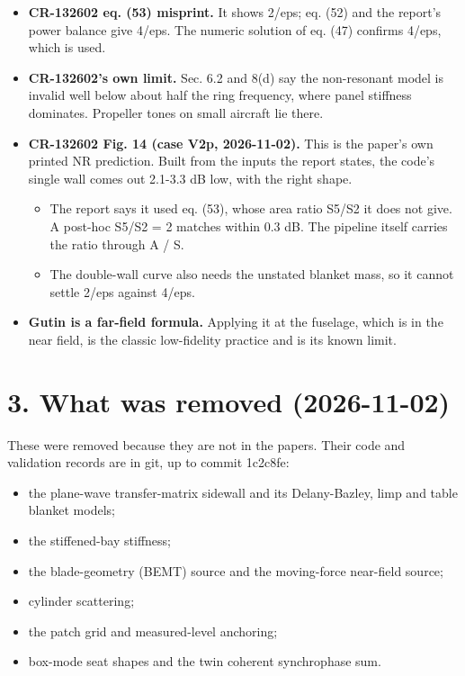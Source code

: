 \documentclass[10pt,a4paper]{article}
\begin{document}
\begin{itemize}
\item \textbf{CR-132602 eq. (53) misprint.} It shows 2/eps; eq. (52) and the report's power balance give 4/eps. The numeric solution of eq. (47) confirms 4/eps, which is used.
\item \textbf{CR-132602's own limit.} Sec. 6.2 and 8(d) say the non-resonant model is invalid well below about half the ring frequency, where panel stiffness dominates. Propeller tones on small aircraft lie there.
\item \textbf{CR-132602 Fig. 14 (case V2p, 2026-11-02).} This is the paper's own printed NR prediction. Built from the inputs the report states, the code's single wall comes out 2.1-3.3 dB low, with the right shape.
\begin{itemize}
\item The report says it used eq. (53), whose area ratio S5/S2 it does not give. A post-hoc S5/S2 = 2 matches within 0.3 dB. The pipeline itself carries the ratio through A / S.
\item The double-wall curve also needs the unstated blanket mass, so it cannot settle 2/eps against 4/eps.
\end{itemize}
\item \textbf{Gutin is a far-field formula.} Applying it at the fuselage, which is in the near field, is the classic low-fidelity practice and is its known limit.
\end{itemize}

\section*{3. What was removed (2026-11-02)}

These were removed because they are not in the papers. Their code and validation records are in git, up to commit 1c2c8fe:

\begin{itemize}
\item the plane-wave transfer-matrix sidewall and its Delany-Bazley, limp and table blanket models;
\item the stiffened-bay stiffness;
\item the blade-geometry (BEMT) source and the moving-force near-field source;
\item cylinder scattering;
\item the patch grid and measured-level anchoring;
\item box-mode seat shapes and the twin coherent synchrophase sum.
\end{itemize}
\end{document}
